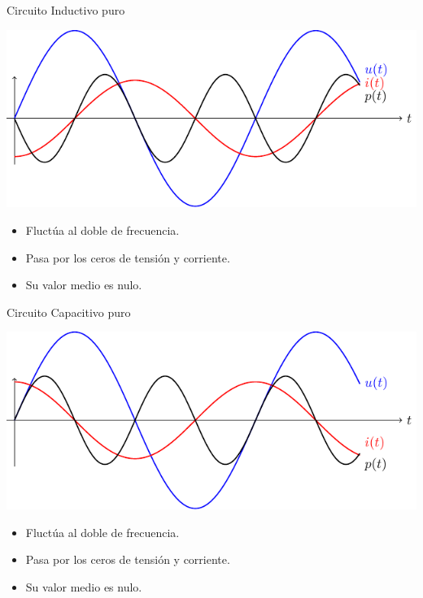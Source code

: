 \documentclass[xcolor={usenames,svgnames,dvipsnames}]{beamer}
\begin{document}
\begin{frame}[label={sec:org9d06a71}]{Circuito Inductivo puro}
\begin{center}
\includegraphics[width=.9\linewidth]{figs/inductivoPuroPotencia.pdf}
\end{center}

\begin{itemize}
\item Fluctúa al doble de frecuencia.
\item Pasa por los ceros de tensión y corriente.
\item Su valor medio es nulo.
\end{itemize}
\end{frame}

\begin{frame}[label={sec:orga5a67b3}]{Circuito Capacitivo puro}
\begin{center}
\includegraphics[width=.9\linewidth]{figs/capacitivoPuroPotencia.pdf}
\end{center}

\begin{itemize}
\item Fluctúa al doble de frecuencia.
\item Pasa por los ceros de tensión y corriente.
\item Su valor medio es nulo.
\end{itemize}
\end{frame}
\end{document}
